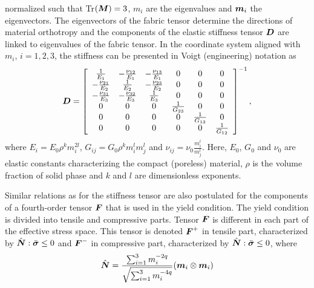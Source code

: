 \documentclass[a4paper]{article}
\newcommand{\mbf}[1]{\mbox{\boldmath$#1$}}
\newcommand{\vsig}{\mbf{\sigma}}%
\begin{document}
normalized such that Tr$(\mbf{M}) = 3$, $m_i$ are the eigenvalues and $\mbf{m}_i$ the eigenvectors.
The eigenvectors of the fabric tensor determine the directions of material orthotropy and the components of the elastic stiffness tensor $\mbf{D}$ are linked to eigenvalues of the fabric tensor. In the coordinate system aligned with $m_i$, $i=1,2,3$,
the stiffness can be presented in Voigt (engineering) notation as
\begin{equation}
  \mbf{D}=\left[\begin{array}{cccccc}
\frac{1}{E_1} & -\frac{\nu_{12}}{E_1}&-\frac{\nu_{13}}{E_1}& 0& 0&0\\
-\frac{\nu_{21}}{E_2} & \frac{1}{E_2}&-\frac{\nu_{23}}{E_2}& 0& 0&0\\
-\frac{\nu_{31}}{E_3} & -\frac{\nu_{32}}{E_3}&\frac{1}{E_3}& 0& 0&0\\
0 & 0 & 0 & \frac{1}{G_{23}} & 0 & 0\\
0 & 0 & 0 & 0 & \frac{1}{G_{13}} & 0\\
0 & 0 & 0 & 0 & 0 & \frac{1}{G_{12}}
 \end{array}\right]^{-1},
\end{equation}
where $E_i = E_0\rho^k m_i^{2l}$, $G_{ij} = G_0 \rho^k m_i^l m_j^l$  and $\nu_{ij} = \nu_0 \frac{m_i^l}{m_j^l}$. Here, $E_0$, $G_0$ and $\nu_0$ are elastic constants characterizing the compact (poreless) material, $\rho$ is the volume fraction of solid phase and $k$ and $l$ are dimensionless exponents.

Similar relations as for the stiffness tensor are also postulated for the components of a fourth-order tensor $\mbf{F}$ that is used in the yield condition. The yield condition is divided into tensile and compressive parts. Tensor $\mbf{F}$ is different in each part of the effective stress space. This tensor is denoted $\mbf{F}^{+}$ in tensile part, characterized by $\hat{\mbf{N}}:\bar{\vsig} \leq 0$ and $\mbf{F}^{-}$ in compressive part, characterized by $\hat{\mbf{N}}:\bar{\vsig} \leq 0$, where
\begin{equation}
\hat{\mbf{N}} = \frac{\sum_{i=1}^{3} m_i^{-2q}}{\sqrt{\sum_{i=1}^3 m_i^{-4q}}}(\mbf{m}_i \otimes \mbf{m}_i)
\end{equation}
\end{document}
